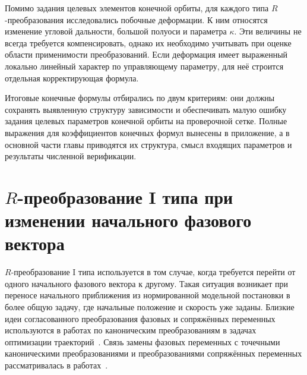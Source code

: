 Помимо задания целевых элементов конечной орбиты, для каждого типа \(R\)-преобразования исследовались побочные деформации. К ним относятся изменение угловой дальности, большой полуоси и параметра \(\kappa\). Эти величины не всегда требуется компенсировать, однако их необходимо учитывать при оценке области применимости преобразований. Если деформация имеет выраженный локально линейный характер по управляющему параметру, для неё строится отдельная корректирующая формула.

Итоговые конечные формулы отбирались по двум критериям: они должны сохранять выявленную структуру зависимости и обеспечивать малую ошибку задания целевых параметров конечной орбиты на проверочной сетке. Полные выражения для коэффициентов конечных формул вынесены в приложение, а в основной части главы приводятся их структура, смысл входящих параметров и результаты численной верификации.

\section{\(R\)-преобразование I типа при изменении начального фазового вектора}

\(R\)-преобразование I типа используется в том случае, когда требуется перейти от одного начального фазового вектора к другому. Такая ситуация возникает при переносе начального приближения из нормированной модельной постановки в более общую задачу, где начальные положение и скорость уже заданы. Близкие идеи согласованного преобразования фазовых и сопряжённых переменных используются в работах по каноническим преобразованиям в задачах оптимизации траекторий~\cite{powers_tapley_1969,haissig_mease_vinh_1992}. Связь замены фазовых переменных с точечными каноническими преобразованиями и преобразованиями сопряжённых переменных рассматривалась в работах~\cite{korneev_phase_variables_2021,korneev_affine_transformations_2025}.

